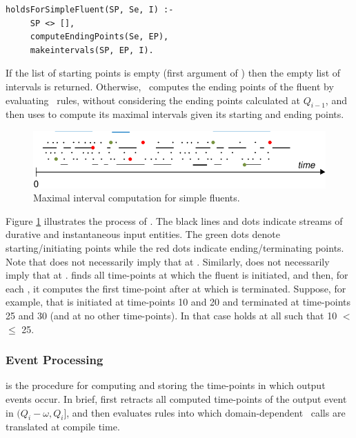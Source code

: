 {\small
\begin{verbatim}
holdsForSimpleFluent(SP, Se, I) :- 
     SP <> [],
     computeEndingPoints(Se, EP),
     makeintervals(SP, EP, I).
\end{verbatim}
}

If the list of starting points is empty (first argument of \holdsForSimpleFluent) then the empty list of intervals is returned. Otherwise, \holdsForSimpleFluent\ computes the ending points  of the fluent by evaluating \terminatedAt\ rules, without considering the ending points calculated at $Q_{i-1}$, and then uses  to compute its maximal intervals given its starting and ending points. 

\begin{figure}[h]
    \centering
    \includegraphics[width=.6\textwidth]{figures/sf4}
    \caption{Maximal interval computation for simple fluents.}
    \label{fig:makeIntervals}
\end{figure}

Figure \ref{fig:makeIntervals} illustrates the process of . The black lines and dots indicate streams of durative and instantaneous input entities. The green dots denote starting/initiating points while the red dots indicate ending/terminating points.  
Note that  does not necessarily imply that  at . Similarly,  does not necessarily imply that  at . 
 finds all time-points  at which the fluent  is initiated, and then, for each , it computes the first time-point  after  at which  is terminated.
Suppose, for example, that   is initiated at time-points 10 and 20 and terminated at time-points 25 and  30 (and at no other time-points). In that case  holds at all  such that 10 $<$  $\leq$ 25. 

\subsubsection{Event Processing}

 is the procedure for computing and storing the time-points in which output events occur. In brief,  first retracts all computed time-points of the output event in $(Q_{i}-\omega, Q_i]$, and then evaluates  rules into which domain-dependent \happensAt\ calls are translated at compile time.